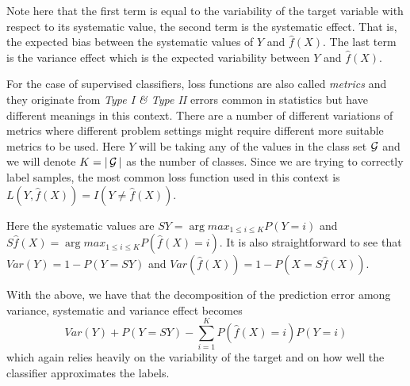 Note here that the first term is equal to the variability of the target variable with respect to its systematic value, the second term is the systematic effect. That is, the expected bias between the systematic values of $Y$ and $\hat{f}(X)$. The last term is the variance effect which is the expected variability between $Y$ and $\hat{f}(X)$.





For the case of supervised classifiers, loss functions are also called \textit{metrics} and they originate from \textit{Type I \& Type II} errors common in statistics but have different meanings in this context.  There are a number of different variations of metrics where different problem settings might require different more suitable metrics to be used. Here $Y$ will be taking any of the values in the class set $\operatorname{\mathcal{G}}$ and we will denote $K = |\operatorname{\mathcal{G}}|$ as the number of classes. Since we are trying to correctly label samples, the most common loss function used in this context is $L(Y, \hat{f}(X)) = I(Y \neq \hat{f}(X))$.

Here the systematic values are  $SY = \arg max_{1\leq i \leq K} P(Y=i)$ and $S\hat{f}(X) = \arg max_{1\leq i \leq K} P(\hat{f}(X)=i)$. It is also straightforward to see that $Var(Y) = 1 - P(Y=SY)$ and $Var(\hat{f}(X)) = 1 -  P(X = S\hat{f}(X)) $.

With the above, we have that the decomposition of the prediction error among variance, systematic and variance effect becomes
\begin{equation}
Var(Y) + P(Y=SY)  - \sum_{i=1}^K P(\hat{f}(X) =i)P(Y=i)	
\end{equation}
	 which again relies heavily on the variability of the target and on how well the classifier approximates the labels.

